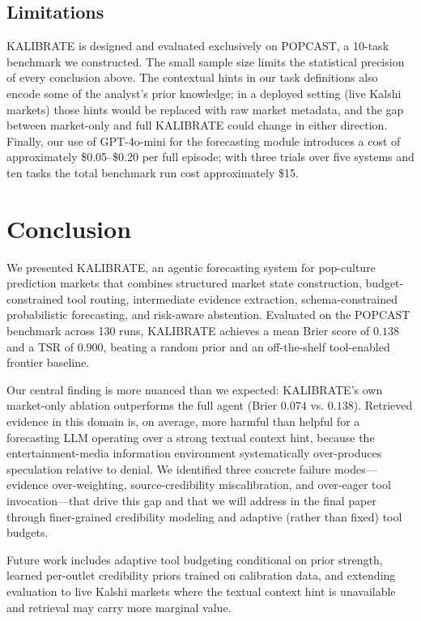 \documentclass{article} %
\newcommand{\agentname}{KALIBRATE}
\newcommand{\benchmarkname}{POPCAST}
\begin{document}
\subsection{Limitations}

\agentname{} is designed and evaluated exclusively on \benchmarkname{}, a 10-task benchmark we constructed. The small sample size limits the statistical precision of every conclusion above. The contextual hints in our task definitions also encode some of the analyst's prior knowledge; in a deployed setting (live Kalshi markets) those hints would be replaced with raw market metadata, and the gap between market-only and full \agentname{} could change in either direction. Finally, our use of GPT-4o-mini for the forecasting module introduces a cost of approximately \$0.05--\$0.20 per full episode; with three trials over five systems and ten tasks the total benchmark run cost approximately \$15.

\section{Conclusion}
\label{sec:conclusion}

We presented \agentname{}, an agentic forecasting system for pop-culture prediction markets that combines structured market state construction, budget-constrained tool routing, intermediate evidence extraction, schema-constrained probabilistic forecasting, and risk-aware abstention. Evaluated on the \benchmarkname{} benchmark across 130 runs, \agentname{} achieves a mean Brier score of $0.138$ and a TSR of $0.900$, beating a random prior and an off-the-shelf tool-enabled frontier baseline.

Our central finding is more nuanced than we expected: \agentname{}'s own market-only ablation outperforms the full agent (Brier $0.074$ vs. $0.138$). Retrieved evidence in this domain is, on average, more harmful than helpful for a forecasting LLM operating over a strong textual context hint, because the entertainment-media information environment systematically over-produces speculation relative to denial. We identified three concrete failure modes---evidence over-weighting, source-credibility miscalibration, and over-eager tool invocation---that drive this gap and that we will address in the final paper through finer-grained credibility modeling and adaptive (rather than fixed) tool budgets.

Future work includes adaptive tool budgeting conditional on prior strength, learned per-outlet credibility priors trained on calibration data, and extending evaluation to live Kalshi markets where the textual context hint is unavailable and retrieval may carry more marginal value.
\end{document}
